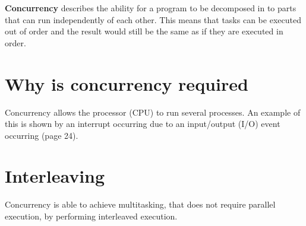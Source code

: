 \documentclass[a4paper]{systems-software}
\begin{document}
\textbf{Concurrency} describes the ability for a program to be decomposed in to parts that can run independently of each other. This means that tasks can be executed out of order and the result would still be the same as if they are executed in order.


\section*{Why is concurrency required}

Concurrency allows the processor (CPU) to run several processes. An example of this is shown by an interrupt occurring due to an input/output (I/O) event occurring (page 24).


\section*{Interleaving}

Concurrency is able to achieve multitasking, that does not require parallel execution, by performing interleaved execution.
\end{document}
